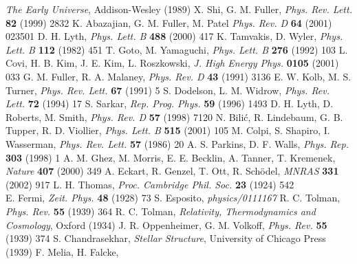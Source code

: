 \begin{thebibliography}{100}
								{\it The Early Universe}, Addison-Wesley (1989)
				X. Shi, G. M. Fuller,
								{\it Phys. Rev. Lett.} {\bf 82} (1999) 2832
				K. Abazajian, G. M. Fuller, M. Patel
								{\it Phys. Rev. D} {\bf 64} (2001) 023501
					D. H. Lyth,
								{\it Phys. Lett. B} {\bf 488} (2000) 417
					K. Tamvakis, D. Wyler,
								{\it Phys. Lett. B} {\bf 112} (1982) 451
					T. Goto, M. Yamaguchi,
								{\it Phys. Lett. B} {\bf 276} (1992) 103
					L. Covi, H. B. Kim, J. E. Kim, L. Roszkowski,
								{\it J. High Energy Phys.} {\bf 0105} (2001) 033
		G. M. Fuller, R. A. Malaney,
								{\it Phys. Rev. D} {\bf 43} (1991) 3136
		E. W. Kolb, M. S. Turner,
								{\it Phys. Rev. Lett.} {\bf 67} (1991) 5
			S. Dodelson, L. M. Widrow,
								{\it Phys. Rev. Lett.} {\bf 72} (1994) 17
				S. Sarkar,
								{\it Rep. Prog. Phys.} {\bf 59} (1996) 1493
			D. H. Lyth, D. Roberts, M. Smith,
								{\it Phys. Rev. D} {\bf 57} (1998) 7120
					N. Bili\'{c}, R. Lindebaum, G. B. Tupper, R. D. Viollier,
								{\it Phys. Lett. B} {\bf 515} (2001) 105
					M. Colpi, S. Shapiro, I. Wasserman,
								{\it Phys. Rev. Lett.} {\bf 57} (1986) 20
				A. S. Parkins, D. F. Walls,
								{\it Phys. Rep.} {\bf 303} (1998) 1
				A. M. Ghez, M. Morris, E. E. Becklin, A. Tanner, T. Kremenek,
								{\it Nature} {\bf 407} (2000) 349
				A. Eckart, R. Genzel, T. Ott, R. Sch\"{o}del,
								{\it MNRAS} {\bf 331} (2002) 917
				L. H. Thomas,
								{\it Proc. Cambridge Phil. Soc.} {\bf 23} (1924) 542\\
							E. Fermi,
								{\it Zeit. Phys.} {\bf 48} (1928) 73
				S. Esposito,
								{\it physics/0111167}
				R. C. Tolman,
								{\it Phys. Rev.} {\bf 55} (1939) 364
				R. C. Tolman,
								{\it Relativity, Thermodynamics and Cosmology}, Oxford (1934)
			J. R. Oppenheimer, G. M. Volkoff,
								{\it Phys. Rev.} {\bf 55} (1939) 374
					S. Chandrasekhar,
								{\it Stellar Structure}, University of Chicago Press (1939)
				F. Melia, H. Falcke,

\end{thebibliography}
